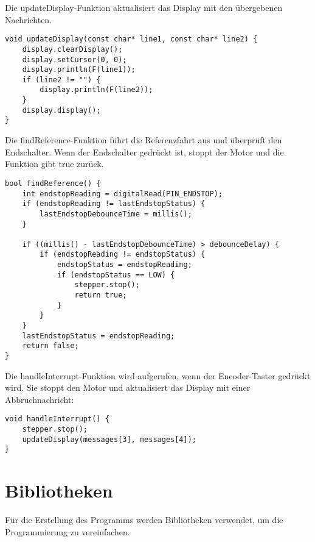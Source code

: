 Die updateDisplay-Funktion aktualisiert das Display mit den übergebenen Nachrichten.

\begin{lstlisting}
void updateDisplay(const char* line1, const char* line2) {
	display.clearDisplay();
	display.setCursor(0, 0);
	display.println(F(line1));
	if (line2 != "") {
		display.println(F(line2));
	}
	display.display();
}
\end{lstlisting}

Die findReference-Funktion führt die Referenzfahrt aus und überprüft den Endschalter. Wenn der Endschalter gedrückt ist, stoppt der Motor und die Funktion gibt true zurück.

\begin{lstlisting}
bool findReference() {
	int endstopReading = digitalRead(PIN_ENDSTOP);
	if (endstopReading != lastEndstopStatus) {
		lastEndstopDebounceTime = millis();
	}
	
	if ((millis() - lastEndstopDebounceTime) > debounceDelay) {
		if (endstopReading != endstopStatus) {
			endstopStatus = endstopReading;
			if (endstopStatus == LOW) {
				stepper.stop();
				return true;
			}
		}
	}
	lastEndstopStatus = endstopReading;
	return false;
}
\end{lstlisting}

Die handleInterrupt-Funktion wird aufgerufen, wenn der Encoder-Taster gedrückt wird. Sie stoppt den Motor und aktualisiert das Display mit einer Abbruchnachricht:

\begin{lstlisting}
void handleInterrupt() {
	stepper.stop();
	updateDisplay(messages[3], messages[4]);
}
\end{lstlisting}

\section{Bibliotheken}
Für die Erstellung des Programms werden Bibliotheken verwendet, um die Programmierung zu vereinfachen.


